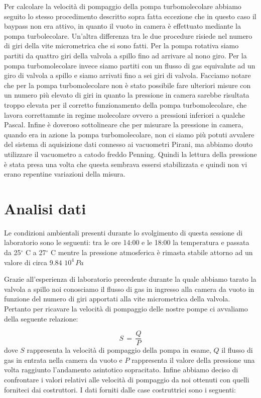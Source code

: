 Per calcolare la velocità di pompaggio della pompa turbomolecolare abbiamo seguito lo stesso procedimento descritto sopra fatta eccezione che in questo caso il baypass non era attivo, in quanto il vuoto in camera è effettuato mediante la pompa turbolecolare.
Un'altra differenza tra le due procedure risiede nel numero di giri della vite micrometrica che si sono fatti. Per la pompa rotativa siamo partiti da quattro giri della valvola a spillo fino ad arrivare al nono giro. Per la pompa turbomolecolare invece siamo partiti con un flusso di gas equivalnte ad un giro di valvola a spillo e siamo arrivati fino a sei giri di valvola. Facciamo notare che per la pompa turbomolecolare non è stato possibile fare ulteriori misure con un numero più elevato di giri in quanto la pressione in camera sarebbe risultata troppo elevata per il corretto funzionamento della pompa turbomolecolare, che lavora correttamnte in regime molecolare ovvero a pressioni inferiori a qualche Pascal.
Infine è doveroso sottolineare che per misurare la pressione in camera, quando era in azione la pompa turbomolecolare, non ci siamo più potuti avvalere del sistema di aquisizione dati connesso ai vacuometri Pirani, ma abbiamo douto utilizzare il vacuometro a catodo freddo Penning. Quindi la lettura della pressione è stata presa una volta che questa sembrava essersi stabilizzata e quindi non vi erano repentine variazioni della misura.  

\section{Analisi dati}

Le condizioni ambientali presenti durante lo svolgimento di questa sessione di laboratorio sono le seguenti: tra le ore 14:00 e le 18:00 la temperatura e passata da 25$^\circ$ C a 27$^\circ$ C mentre la pressione atmosferica è rimasta stabile attorno ad un valore di circa $9.84\,\,10^4\, Pa$

Grazie all'esperienza di laboratorio precedente durante la quale abbiamo tarato la valvola a spillo noi conosciamo il flusso di gas in ingresso alla camera da vuoto in funzione del numero di giri apportati alla vite micrometrica della valvola.
Pertanto per ricavare la velocità di pompaggio delle nostre pompe ci avvaliamo della seguente relazione:

\begin{equation}
	S \,=\, \frac{Q}{P}
\end{equation}
%
dove $S$ rappresenta la velocità di pompaggio della pompa in esame, $Q$ il flusso di gas in entrata nella camera da vuoto e $P$ rappresenta il valore della pressione una volta raggiunto l'andamento asintotico sopracitato. 
%
%
%
%
Infine abbiamo deciso di confrontare i valori relativi alle velocità di pompaggio da noi ottenuti con quelli forniteci dai costruttori. I dati forniti dalle case costruttrici sono i seguenti:
%
%

